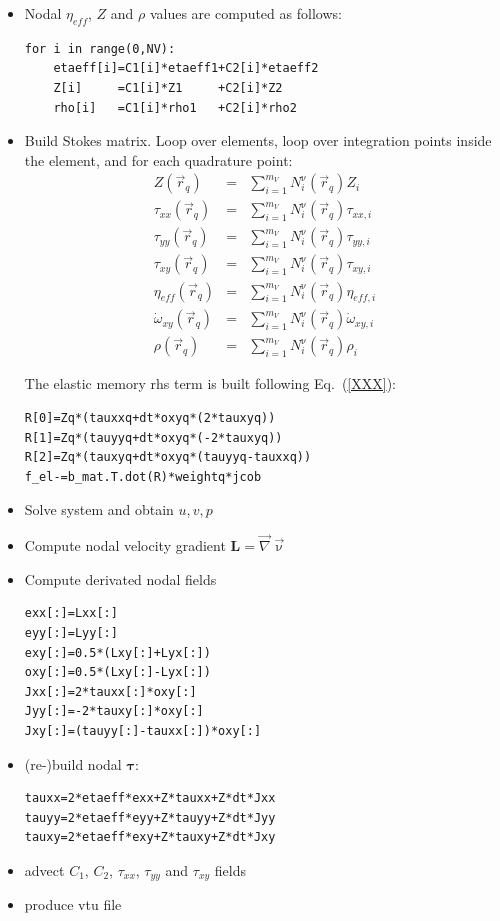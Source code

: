\begin{itemize}
\item Nodal $\eta_{eff}$, $Z$ and $\rho$ values are computed as follows:
\begin{lstlisting}
for i in range(0,NV):
    etaeff[i]=C1[i]*etaeff1+C2[i]*etaeff2
    Z[i]     =C1[i]*Z1     +C2[i]*Z2
    rho[i]   =C1[i]*rho1   +C2[i]*rho2
\end{lstlisting}

\item Build Stokes matrix. 
Loop over elements, loop over integration points inside the element, and for 
each quadrature point:
\begin{eqnarray}
Z(\vec{r}_q) &=& \sum_{i=1}^{m_V} N_i^\upnu(\vec{r}_q) Z_i \\
\tau_{xx}(\vec{r}_q)&=& \sum_{i=1}^{m_V} N_i^\upnu(\vec{r}_q) \tau_{xx,i} \\
\tau_{yy}(\vec{r}_q)&=& \sum_{i=1}^{m_V} N_i^\upnu(\vec{r}_q) \tau_{yy,i} \\
\tau_{xy}(\vec{r}_q)&=& \sum_{i=1}^{m_V} N_i^\upnu(\vec{r}_q) \tau_{xy,i} \\
\eta_{eff}(\vec{r}_q)&=& \sum_{i=1}^{m_V} N_i^\upnu(\vec{r}_q) \eta_{eff,i} \\
\dot{\omega}_{xy}(\vec{r}_q) &=& \sum_{i=1}^{m_V} N_i^\upnu(\vec{r}_q)  \dot{\omega}_{xy,i} \\
\rho(\vec{r}_q) &=& \sum_{i=1}^{m_V} N_i^\upnu(\vec{r}_q) \rho_i 
\end{eqnarray}


The elastic memory rhs term is built following Eq.~(\ref{XXX}):
\begin{lstlisting}
R[0]=Zq*(tauxxq+dt*oxyq*(2*tauxyq))
R[1]=Zq*(tauyyq+dt*oxyq*(-2*tauxyq))
R[2]=Zq*(tauxyq+dt*oxyq*(tauyyq-tauxxq))
f_el-=b_mat.T.dot(R)*weightq*jcob
\end{lstlisting}

\item Solve system and obtain $u,v,p$

\item Compute nodal velocity gradient ${\bm L}=\vec\nabla\vec\upnu$

\item Compute derivated nodal fields 

\begin{lstlisting}
exx[:]=Lxx[:]
eyy[:]=Lyy[:]
exy[:]=0.5*(Lxy[:]+Lyx[:])
oxy[:]=0.5*(Lxy[:]-Lyx[:])
Jxx[:]=2*tauxx[:]*oxy[:]
Jyy[:]=-2*tauxy[:]*oxy[:]
Jxy[:]=(tauyy[:]-tauxx[:])*oxy[:]
\end{lstlisting}

\item (re-)build nodal ${\bm \tau}$: 
\begin{lstlisting}
tauxx=2*etaeff*exx+Z*tauxx+Z*dt*Jxx
tauyy=2*etaeff*eyy+Z*tauyy+Z*dt*Jyy
tauxy=2*etaeff*exy+Z*tauxy+Z*dt*Jxy
\end{lstlisting}

\item advect $C_1$, $C_2$, $\tau_{xx}$, $\tau_{yy}$ and $\tau_{xy}$ fields

\item produce vtu file

\end{itemize}
